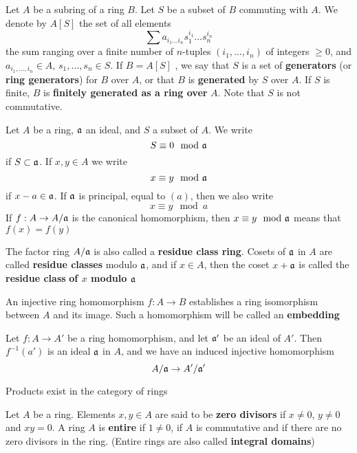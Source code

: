 \documentclass[11pt]{article}
\begin{document}
Let \(A\) be a subring of a ring \(B\). Let \(S\) be a subset of \(B\) commuting with \(A\). We
denote by \(A[S]\) the set of all elements
\begin{equation*}
\sum a_{i_1\dots i_n}s_1^{i_1}\dots s_n^{i_n}
\end{equation*}
the sum ranging over a finite number of \(n\)-tuples \((i_1,\dots,i_n)\) of integers \(\ge 0\),
and \(a_{i_1,\dots,i_n}\in A\), \(s_1,\dots,s_n\in S\). If \(B=A[S]\) , we say that \(S\) is a set of
\textbf{generators} (or \textbf{ring generators}) for \(B\) over \(A\), or that \(B\) is \textbf{generated} by \(S\)
over \(A\). If \(S\) is finite, \(B\) is \textbf{finitely generated as a ring over} \(A\). Note that \(S\)
is not commutative.

Let \(A\) be a ring, \(\mathfrak{a}\) an ideal, and \(S\) a subset of \(A\). We write
\begin{equation*}
S\equiv 0\mod {\mathfrak{a}}
\end{equation*}
if \(S\subset\mathfrak{a}\). If \(x,y\in A\) we write
\begin{equation*}
x\equiv y\mod{\mathfrak{a}}
\end{equation*}
if \(x-a\in\mathfrak{a}\).  If \(\mathfrak{a}\) is principal, equal to \((a)\), then we also write
\begin{equation*}
x\equiv y\mod a
\end{equation*}
If \(f:A\to A/\mathfrak{a}\) is the canonical homomorphism, then \(x\equiv y\mod{\mathfrak{a}}\) means that \(f(x)=f(y)\)

The factor ring \(A/\mathfrak{a}\) is also called a \textbf{residue class ring}. Cosets of \(\mathfrak{a}\) in \(A\) are called
\textbf{residue classes} modulo \(\mathfrak{a}\), and if \(x\in A\), then the coset \(x+\mathfrak{a}\) is called the \textbf{residue class}
\textbf{of \(x\) modulo \(\mathfrak{a}\)}

An injective ring homomorphism \(f:A\to B\) establishes a ring isomorphism between \(A\) and its
image. Such a homomorphism will be called an \textbf{embedding}

Let \(f:A\to A'\) be a ring homomorphism, and let \(\mathfrak{a}'\) be an ideal of \(A'\). Then \(f^{-1}(a')\)
is an ideal \(\mathfrak{a}\) in \(A\), and we have an induced injective homomorphism
\begin{equation*}
A/\mathfrak{a}\to A'/\mathfrak{a}'
\end{equation*}

\begin{proposition}[]
Products exist in the category of rings
\end{proposition}

Let \(A\) be a ring. Elements \(x,y\in A\) are said to be \textbf{zero divisors} if \(x\neq 0\), \(y\neq 0\)
and \(xy=0\). A ring \(A\) is \textbf{entire} if \(1\neq 0\), if \(A\) is commutative and if there are no
zero divisors in the ring. (Entire rings are also called \textbf{integral domains})
\end{document}
